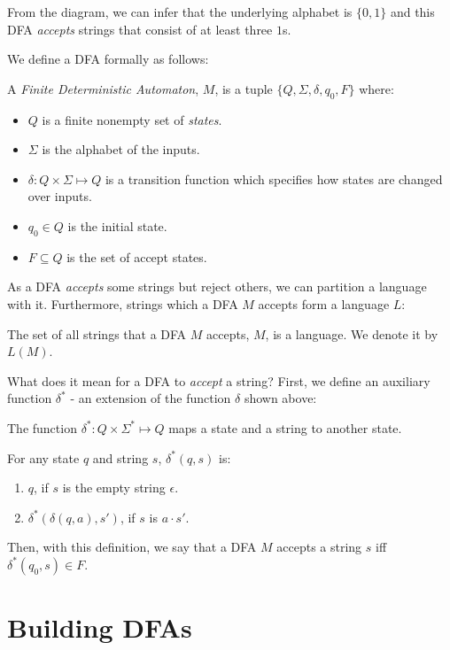 \documentclass[11pt]{article}
\begin{document}
From the diagram, we can infer that the underlying alphabet is $\{0, 1\}$ and this DFA \emph{accepts} strings
that consist of at least three $1$s.

We define a DFA formally as follows:
\begin{definition}
A \emph{Finite Deterministic Automaton}, $M$, is a tuple $\{Q, \Sigma, \delta, q_0, F\}$ where:
\begin{itemize}
\item $Q$ is a finite nonempty set of \emph{states}.
\item $\Sigma$ is the alphabet of the inputs.
\item $\delta: Q \times \Sigma \mapsto Q$ is a transition function which specifies how states are changed over
inputs.
\item $q_0 \in Q$ is the initial state.
\item $F \subseteq Q$ is the set of accept states.
\end{itemize}
\end{definition}

As a DFA \emph{accepts} some strings but reject others, we can partition a language with it. Furthermore,
strings which a DFA $M$ accepts form a language $L$:
\begin{definition}
The set of all strings that a DFA $M$ accepts, $M$, is a language. We denote it by $L(M)$.
\end{definition}

What does it mean for a DFA to \emph{accept} a string? First, we define an auxiliary function $\delta ^ \ast$ - an
extension of the function $\delta$ shown above:
\begin{definition}
The function $\delta ^ \ast : Q \times \Sigma ^ \ast \mapsto Q$ maps a state and a string to another state.

For any state $q$ and string $s$, $\delta ^ \ast (q, s)$ is:
\begin{enumerate}
\item $q$, if $s$ is the empty string $\epsilon$.
\item $\delta ^ \ast( \delta(q, a), s' )$, if $s$ is $a \cdot s'$.
\end{enumerate}
\end{definition}

Then, with this definition, we say that a DFA $M$ accepts a string $s$ iff $\delta ^ \ast(q_0, s) \in F$.

\section{Building DFAs}
\end{document}
